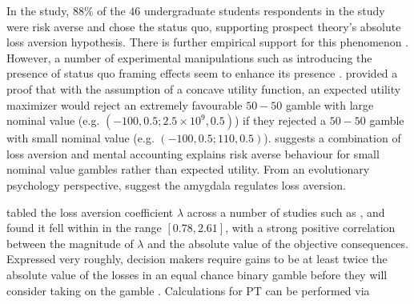 \documentclass{article}\usepackage[]{graphicx}\usepackage[]{color}
\begin{document}
In the \cite{Erev_2013} study, $88\%$ of the $46$ undergraduate students respondents in the study were risk averse and chose the status quo, supporting prospect theory's absolute loss aversion
hypothesis. There is further empirical support for this phenomenon \citep[see, e.g.][]{Brooks_Zank_2005, Birnbaum_Bahra_2007, Ert_Erev_2008,  McGraw_Larsen_Kahneman_Schkade_2010, Redelmeier_Tversky_1992}. However, a number of experimental manipulations such as introducing the presence of status quo framing effects seem to enhance its presence \citep*{Erev_2013}. \cite{Rabin_2000} provided a proof that with the assumption of a concave utility function, an expected utility maximizer would reject an extremely favourable $50-50$ gamble with large nominal value (e.g. $(-100, 0.5; 2.5 \times 10^9, 0.5)$) if they rejected a $50-50$ gamble with small nominal value (e.g. $(-100, 0.5; 110, 0.5)$). \cite{Rabin_Thaler_2001} suggests a combination of loss aversion and mental accounting explains risk averse behaviour for small nominal value gambles rather than expected utility.
From an evolutionary psychology perspective, \cite{de_Martino_Camerer_Adolphs_Purves_2010} suggest the amygdala regulates loss aversion.

\cite{Erev_2013} tabled the loss aversion coefficient $\lambda$ across a number of studies such as \cite{Kobberling_Wakker_2005, Abdellaoui_Bleichrodt_Paraschiv_2007}, and found it fell within in the range $[0.78, 2.61]$,
with a strong positive correlation between the magnitude of $\lambda$ and the absolute value of the
objective consequences. Expressed very roughly, decision makers require gains to be at least twice the absolute value of the losses in an equal chance binary gamble before they will consider taking on the gamble \cite[see][p. 1053-1054]{Tversky_Kahneman_1991}. Calculations for PT can be performed via
\end{document}
